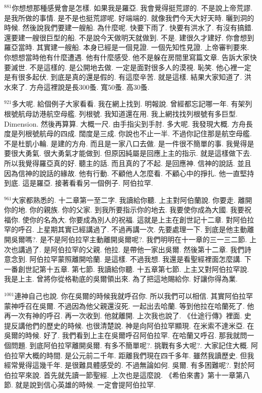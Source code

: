 \documentclass{book}
\begin{document}
$^{881}$你想想那種感覺會是怎樣.
如果我是羅亞.
我會覺得挺荒謬的.
不是說上帝荒謬.
是我所做的事情.
是不是也挺荒謬呢.
好端端的.
就像我們今天大好天時.
曬到洞的時候.
然後說我們要建一艘船.
為什麼呢.
快要下雨了.
快要有洪水了.
有沒有搞錯.
還要建一艘很巨型的船.
不是說今天做明天就做到.
不是.
建很久才建好.
你會想到羅亞當時.
其實建一艘船.
本身已經是一個見證.
一個先知性見證.
上帝審判要來.
你想想當時他有什麼遭遇.
他有什麼感受.
他不是躲在房間里寫篇文章.
告訴大家快要滅世.
不是這樣的.
是公開地去做.
一定是面對很多人的漠視.
恥笑.
他心裡一定是有很多起伏.
到底是真的還是假的.
有這麼辛苦.
就是這樣.
結果大家知道了.
洪水來了.
方舟這裡說是長300蚤.
寬50蚤.
高30蚤.

$^{921}$多大呢.
給個例子大家看看.
我在網上找到.
明報說.
曾經都忘記哪一年.
有架列根號航母訪港航空母艦.
列根號.
我知道還在用.
我上網找找列根號有多巨型.
Dimension.
然後再算算.
大概一尺.
由手指尖到手肘.
多大呢.
我發現大概.
方舟長度是列根號航母的四成.
闊度是三成.
你說也不止一半.
不過你記住那是航空母艦.
不是杜凱小輪.
是建的方舟.
而且是一家八口去做.
是一件很不簡單的事.
我覺得是要很大勇氣.
很大勇氣才能做到.
但原因純屬是回應上主的指示.
就是這樣做下去.
所以我覺得羅亞真的好.
聽主的話.
而且真的了不起.
是回應神.
信神的說話.
並且因為信神的說話的緣故.
他有行動.
不顧他人怎麼看.
不顧心中的掙扎.
他一直堅持到底.
這是羅亞.
接著看看另一個例子.
阿伯拉罕.

$^{961}$大家都熟悉的.
十二章第一至二字.
我讀給你聽.
上主對阿伯蘭說.
你要走.
離開你的地.
你的親族.
你的父家.
到我所要指示你的地去.
我要使你成為大國.
我要祝福你.
使你的名為大.
你要成為別人的祝福.
這就是上主在創世記十二章.
對阿伯拉罕的呼召.
上星期其實已經講過了.
不過再講一次.
先要處理一下.
到底是他主動離開吳爾嗎?.
是不是阿伯拉罕主動離開吳爾呢?.
我們明明在十一章的三一三二節.
上次也講過了.
是阿伯拉罕的父親.
他拉.
是帶他一家出吳爾.
然後第十二章.
我們詩意念到.
阿伯拉罕蒙照離開哈蘭.
是這樣.
不過我想.
我還是看聖經裡面怎麼講.
下一番創世記第十五章.
第七節.
我讀給你聽.
十五章第七節.
上主又對阿伯拉罕說.
我是上主.
曾將你從格勒底的吳爾領出來.
為了把這地賜給你.
好讓你得為業.

$^{1001}$連神自己也說.
你在吳爾的時候我就呼召你.
所以我們可以相信.
其實阿伯拉罕蒙神呼召在吳爾.
不過因為他父親還沒死.
一起出去哈蘭.
等到他拉在哈蘭死了.
他再一次有神的呼召.
再一次收到.
他就離開.
上次我也說了.
《仕途行傳》裡面.
史提反講他們的歷史的時候.
也很清楚說.
神是向阿伯拉罕顯現.
在米索不達米亞.
在吳爾的時候.
好了.
我們看到上主在吳爾呼召阿伯拉罕.
在哈蘭又呼召.
那我就問一個問題.
到底阿伯拉罕離開吳爾.
有多不簡單呢?.
挑戰有多大呢?.
大家記住大概.
阿伯拉罕大概的時間.
是公元前二千年.
距離我們現在四千多年.
雖然我讀歷史.
但我經常覺得這幾千年.
是很難具體感受的.
不過無論如何.
吳爾.
有多困難呢?.
對於阿伯拉罕來說.
首先就先讀一節聖經.
上次也是這麼說.
《希伯來書》第十一章第八節.
就是說到信心英雄的時候.
一定會提阿伯拉罕.
\end{document}
